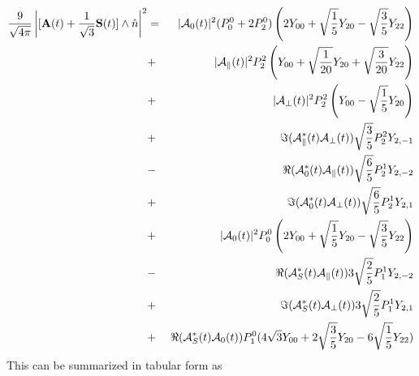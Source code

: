 \documentclass[a4paper,10pt,twosided]{article}
\begin{document}
\begin{eqnarray}
\frac{9 }{\sqrt{4\pi}} \left|[{ \bf A}(t) + \frac{1}{\sqrt{3}}{\bf S}(t)] \wedge \hat{n}\right|^2
                              &=&|{\cal A}_0(t)|^2  (P_0^0+2P_2^0 ) \left( 2 Y_{00}+\sqrt{\frac{1}{5}}Y_{20}-\sqrt{\frac{3}{5}}Y_{22} \right) \\
                              &+&|{\cal A}_\parallel(t)|^2 P_2^2 \left( Y_{00}+\sqrt{\frac{1}{20}}Y_{20}+\sqrt{\frac{3}{20}}Y_{22}  \right)  \\
                              &+&|{\cal A}_\perp(t)|^2  P_2^2 \left( Y_{00} - \sqrt{\frac{1}{5}}Y_{20}\right)\\
                              &+&\Im({\cal A}_\parallel^*(t){\cal A}_\perp(t)) \sqrt{\frac{3}{5}}P_2^2 Y_{2,-1}  \\
                              &-&\Re({\cal A}_0^*(t){\cal A}_\parallel(t)  )   \sqrt{\frac{6}{5}}P_2^1 Y_{2,-2} \\
                              &+&\Im({\cal A}_0^*(t) {\cal A}_\perp(t) )       \sqrt{\frac{6}{5}}P_2^1Y_{2,1} \\
                              &+&|{\cal A}_0(t)|^2 P_0^0\left( 2 Y_{00}+\sqrt{\frac{1}{5}}Y_{20}-\sqrt{\frac{3}{5}}Y_{22} \right)\\
                              &-&\Re({\cal A}_S^*(t){\cal A}_\parallel(t))3\sqrt{\frac{2}{5}}P_1^1Y_{2,-2}\\
                              &+&\Im({\cal A}_S^*(t){\cal A}_\perp(t))3\sqrt{\frac{2}{5}}P_1^1Y_{2,1}\\
                              &+&\Re({\cal A}_S^*(t){\cal A}_0(t)) P_1^0(4\sqrt{3}Y_{00}+2\sqrt{\frac{3}{5}}Y_{20}-6\sqrt{\frac{1}{5}}Y_{22})
\end{eqnarray}
This can be summarized in tabular form as
\end{document}
